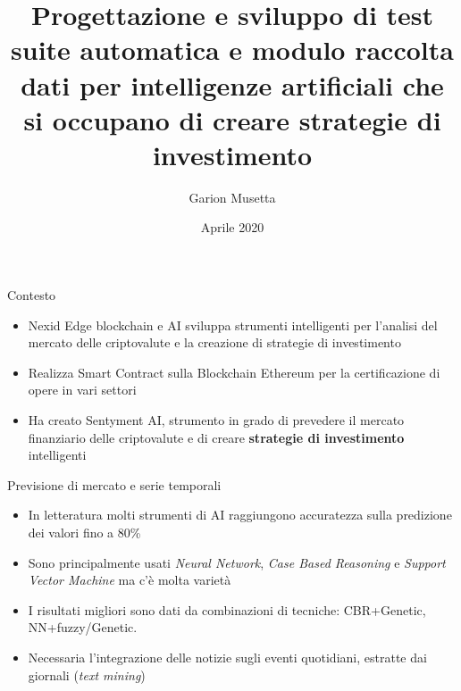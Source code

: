 \documentclass{beamer}
\title[Trading AI]{Progettazione e sviluppo di test suite automatica e modulo raccolta dati per intelligenze artificiali che si occupano di creare strategie di investimento}
\author{Garion Musetta}
\date{Aprile 2020}
\begin{document}
\maketitle

\begin{frame}{Contesto}
\begin{itemize}
\item Nexid Edge blockchain e AI sviluppa strumenti intelligenti per l’analisi del mercato delle criptovalute e
la creazione di strategie di investimento
\item Realizza Smart Contract sulla Blockchain Ethereum per la certificazione di opere in vari settori
\item Ha creato Sentyment AI, strumento in grado di prevedere il mercato finanziario delle criptovalute e di creare \textbf{strategie di investimento} intelligenti
\end{itemize}
\begin{figure}
\end{figure}
\end{frame}

\begin{frame}{Previsione di mercato e serie temporali}
\begin{itemize}
\item In letteratura molti strumenti di AI raggiungono accuratezza sulla predizione dei valori fino a 80\%
\item Sono principalmente usati \textit{Neural Network}, \textit{Case Based Reasoning} e \textit{Support Vector Machine} ma c'è molta varietà
\item I risultati migliori sono dati da combinazioni di tecniche: CBR+Genetic, NN+fuzzy/Genetic.
\item Necessaria l'integrazione delle notizie sugli eventi quotidiani, estratte dai giornali (\textit{text mining})
\end{itemize}
\end{frame}
\end{document}
